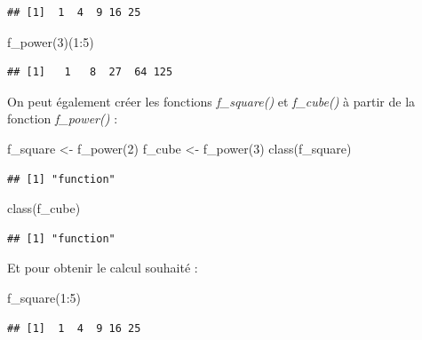 \documentclass[
]{book}
\newenvironment{Shaded}{\begin{snugshade}}{\end{snugshade}}
\newcommand{\DecValTok}[1]{\textcolor[rgb]{0.00,0.00,0.81}{#1}}
\newcommand{\FunctionTok}[1]{\textcolor[rgb]{0.00,0.00,0.00}{#1}}
\newcommand{\NormalTok}[1]{#1}
\newcommand{\OtherTok}[1]{\textcolor[rgb]{0.56,0.35,0.01}{#1}}
\newcommand{\SpecialCharTok}[1]{\textcolor[rgb]{0.00,0.00,0.00}{#1}}
\theoremstyle{definition}
\theoremstyle{definition}
\theoremstyle{definition}
\theoremstyle{definition}
\theoremstyle{remark}
\begin{document}
\begin{verbatim}
## [1]  1  4  9 16 25
\end{verbatim}

\begin{Shaded}
\begin{Highlighting}[]
\FunctionTok{f\_power}\NormalTok{(}\DecValTok{3}\NormalTok{)(}\DecValTok{1}\SpecialCharTok{:}\DecValTok{5}\NormalTok{)}
\end{Highlighting}
\end{Shaded}

\begin{verbatim}
## [1]   1   8  27  64 125
\end{verbatim}

On peut également créer les fonctions \emph{f\_square()} et \emph{f\_cube()} à partir de la fonction \emph{f\_power()} :

\begin{Shaded}
\begin{Highlighting}[]
\NormalTok{f\_square }\OtherTok{\textless{}{-}} \FunctionTok{f\_power}\NormalTok{(}\DecValTok{2}\NormalTok{)}
\NormalTok{f\_cube }\OtherTok{\textless{}{-}} \FunctionTok{f\_power}\NormalTok{(}\DecValTok{3}\NormalTok{)}
\FunctionTok{class}\NormalTok{(f\_square)}
\end{Highlighting}
\end{Shaded}

\begin{verbatim}
## [1] "function"
\end{verbatim}

\begin{Shaded}
\begin{Highlighting}[]
\FunctionTok{class}\NormalTok{(f\_cube)}
\end{Highlighting}
\end{Shaded}

\begin{verbatim}
## [1] "function"
\end{verbatim}

Et pour obtenir le calcul souhaité :

\begin{Shaded}
\begin{Highlighting}[]
\FunctionTok{f\_square}\NormalTok{(}\DecValTok{1}\SpecialCharTok{:}\DecValTok{5}\NormalTok{)}
\end{Highlighting}
\end{Shaded}

\begin{verbatim}
## [1]  1  4  9 16 25
\end{verbatim}
\end{document}
